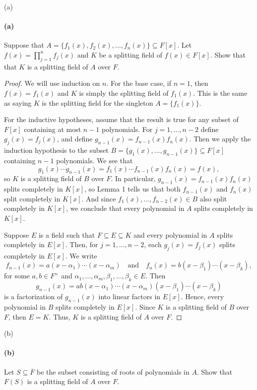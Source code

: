 \documentclass[12pt]{article}
\newenvironment{fullbox}{\begin{lrbox}{\savefullbox}\begin{minipage}{\dimexpr\textwidth-2\fboxsep\relax}}{\end{minipage}\end{lrbox}\begin{center}\framebox[\textwidth]{\usebox{\savefullbox}}\end{center}}
\newenvironment{pbox}[1][]{\begin{fullbox}\ifx#1\empty\else\paragraph{#1}\fi}{\end{fullbox}}
\theoremstyle{definition}
\newcommand{\isp}[1]{\quad\text{#1}\quad}
\newcommand{\clo}{\overline}
\begin{document}
\begin{pbox}[(a)]
    Suppose that $A = \{f_1(x), f_2(x), \dots, f_n(x)\} \subseteq F[x]$. Let $f(x) = \prod_{j=1}^{n} f_j(x)$ and $K$ be a splitting field of $f(x) \in F[x]$. Show that that $K$ is a splitting field of $A$ over $F$.
\end{pbox}

\begin{proof}
    We will use induction on $n$. For the base case, if $n = 1$, then $f(x) = f_1(x)$ and $K$ is simply the splitting field of $f_1(x)$. This is the same as saying $K$ is the splitting field for the singleton $A = \{f_1(x)\}$.
    
    For the inductive hypotheses, assume that the result is true for any subset of $F[x]$ containing at most $n - 1$ polynomials. For $j = 1, \dots, n - 2$ define $g_j(x) = f_j(x)$, and define $g_{n-1}(x) = f_{n-1}(x)f_n(x)$. Then we apply the induction hypothesis to the subset $B = \{g_1(x), \dots, g_{n-1}(x)\} \subseteq F[x]$ containing $n - 1$ polynomials. We see that
    \[
        g_1(x) \cdots g_{n-1}(x) = f_1(x) \cdots f_{n-1}(x)f_n(x) = f(x),
    \]
    so $K$ is a splitting field of $B$ over $F$. In particular, $g_{n-1}(x) = f_{n-1}(x)f_n(x)$ splits completely in $K[x]$, so Lemma 1 tells us that both $f_{n-1}(x)$ and $f_n(x)$ split completely in $K[x]$. And since $f_1(x), \dots, f_{n-2}(x) \in B$ also split completely in $K[x]$, we conclude that every polynomial in $A$ splits completely in $K[x]$.
    
    Suppose $E$ is a field such that $F \subseteq E \subseteq K$ and every polynomial in $A$ splits completely in $E[x]$. Then, for $j = 1, \dots, n-2$, each $g_j(x) = f_j(x)$ splits completely in $E[x]$. We write
    \[
        f_{n-1}(x) = a(x - \alpha_1) \cdots (x - \alpha_m) \isp{and} f_n(x) = b(x - \beta_1) \cdots (x - \beta_k),
    \]
    for some $a, b \in F^\times$ and $\alpha_1, \dots, \alpha_m, \beta_1, \dots, \beta_k \in E$. Then
    \[
        g_{n-1}(x) = ab(x - \alpha_1) \cdots (x - \alpha_m)(x - \beta_1) \cdots (x - \beta_k)
    \]
    is a factorization of $g_{n-1}(x)$ into linear factors in $E[x]$. Hence, every polynomial in $B$ splits completely in $E[x]$. Since $K$ is a splitting field of $B$ over $F$, then $E = K$. Thus, $K$ is a splitting field of $A$ over $F$.

\end{proof}

\begin{pbox}[(b)]
    Let $S \subseteq \clo{F}$ be the subset consisting of roots of polynomials in $A$. Show that $F(S)$ is a splitting field of $A$ over $F$.
\end{pbox}
\end{document}
